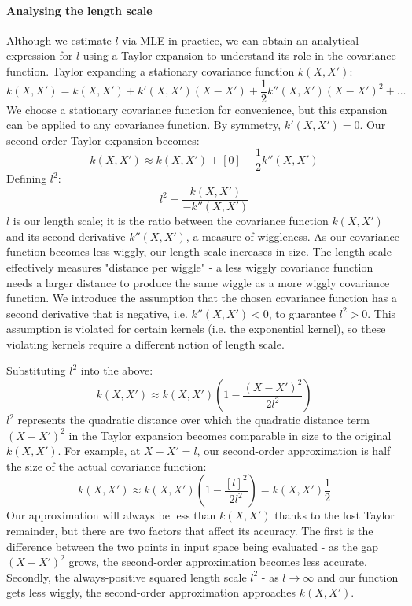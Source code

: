 \paragraph{Analysing the length scale}
Although we estimate $l$ via MLE in practice, we can obtain an analytical expression for $l$ using a Taylor expansion to understand its role in the covariance function. Taylor expanding a stationary covariance function $k(X, X')$: 
\begin{equation*}
    k(X, X') = k(X, X') + k'(X, X')(X - X') + \frac{1}{2}k''(X, X')(X - X')^2 + \ldots
\end{equation*}
We choose a stationary covariance function for convenience, but this expansion can be applied to any covariance function. By symmetry, $k'(X, X') = 0$. Our second order Taylor expansion becomes:
\begin{equation*}
    k(X, X') \approx k(X, X') + [0] + \frac{1}{2} k''(X, X')
\end{equation*}
Defining $l^2$:
\begin{equation} \label{eq:taylor_l}
    l^2 = \frac{k(X, X')}{-k''(X, X')}
\end{equation}
$l$ is our length scale; it is the ratio between the covariance function $k(X, X')$ and its second derivative $k''(X, X')$, a measure of wiggleness. As our covariance function becomes less wiggly, our length scale increases in size. The length scale effectively measures "distance per wiggle" - a less wiggly covariance function needs a larger distance to produce the same wiggle as a more wiggly covariance function. 
We introduce the assumption that the chosen covariance function has a second derivative that is negative, i.e. $k''(X, X') < 0$, to guarantee $l^2 > 0$. This assumption is violated for certain kernels (i.e. the exponential kernel), so these violating kernels require a different notion of length scale.

Substituting $l^2$ into the above:
\begin{equation*}
    k(X, X') \approx k(X, X')\left(1 - \frac{(X - X')^2}{2l^2} \right)
\end{equation*}
$l^2$ represents the quadratic distance over which the quadratic distance term $(X - X')^2$ in the Taylor expansion becomes comparable in size to the original $k(X, X')$. For example, at $X - X' = l$, our second-order approximation is half the size of the actual covariance function:
\begin{equation*}
    k(X, X') \approx k(X, X')\left(1 - \frac{[l]^2}{2l^2} \right) = k(X, X') \frac{1}{2}
\end{equation*}
Our approximation will always be less than $k(X, X')$ thanks to the lost Taylor remainder, but there are two factors that affect its accuracy. The first is the difference between the two points in input space being evaluated - as the gap $(X - X')^2$ grows, the second-order approximation becomes less accurate. Secondly, the always-positive squared length scale $l^2$ - as $l \to\infty$ and our function gets less wiggly, the second-order approximation approaches $k(X, X')$.

